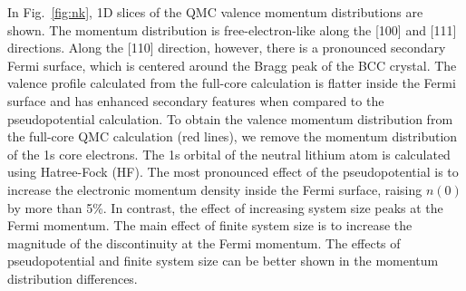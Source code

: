 \documentclass[aps,prb,showpacs,preprintnumbers,amsmath,amssymb,superscriptaddress,twocolumn]{revtex4}
\begin{document}
In Fig.~\ref{fig:nk}, 1D slices of the QMC valence momentum distributions are shown. The momentum distribution is free-electron-like along the [100] and [111] directions. Along the [110] direction, however, there is a pronounced secondary Fermi surface, which is centered around the Bragg peak of the BCC crystal. The valence profile calculated from the full-core calculation is flatter inside the Fermi surface and has enhanced secondary features when compared to the pseudopotential calculation. To obtain the valence momentum distribution from the full-core QMC calculation (red lines), we remove the momentum distribution of the 1s core electrons. The 1s orbital of the neutral lithium atom is calculated using Hatree-Fock (HF). The most pronounced effect of the pseudopotential is to increase the electronic momentum density inside the Fermi surface, raising $n(0)$ by more than 5\%. In contrast, the effect of increasing system size peaks at the Fermi momentum. The main effect of finite system size is to increase the magnitude of the discontinuity at the Fermi momentum. The effects of pseudopotential and finite system size can be better shown in the momentum distribution differences.
\end{document}
